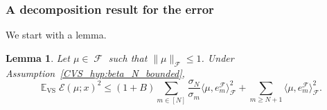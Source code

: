 \documentclass[twoside,11pt]{book}
\newtheorem{lemma}{Lemma}
\numberwithin{theorem}{chapter}
\numberwithin{definition}{chapter}
\numberwithin{proposition}{chapter}
\numberwithin{corollary}{chapter}
\numberwithin{example}{chapter}
\numberwithin{lemma}{chapter}
\numberwithin{assumption}{chapter}
\DeclareMathOperator{\VS}{\mathrm{VS}}
\DeclareMathOperator{\EX}{\mathbb{E}}
\DeclareMathOperator{\F}{\mathcal{F}}
\newcommand{\rb}[1]{\textcolor{magenta}{#1}}
\begin{document}
\subsubsection{A decomposition result for the error}
We start with a lemma.
\begin{lemma}\label{CVS_lemma:delayed_bounds}
Let $\mu \in \F$ such that $\|\mu\|_{\F} \leq 1$. Under Assumption~\ref{CVS_hyp:beta_N_bounded},
\begin{equation}\label{CVS_eq:EX_VS_slow_rates}
\EX_{\VS} \mathcal{E}(\mu;x)^{2} \leq (1+B) \sum\limits_{m \in [N]} \frac{\sigma_{N}}{\sigma_{m}} \langle \mu,e_{m}^{\F} \rangle_{\F}^{2} + \sum\limits_{m \geq N+1} \langle \mu,e_{m}^{\F} \rangle_{\F}^{2}.
\end{equation}
\end{lemma}
\end{document}
